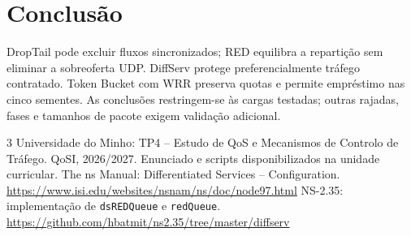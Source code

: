 \documentclass[runningheads]{llncs}
\begin{document}
\section{Conclusão}
DropTail pode excluir fluxos sincronizados; RED equilibra a repartição sem eliminar a sobreoferta UDP. DiffServ protege preferencialmente tráfego contratado. Token Bucket com WRR preserva quotas e permite empréstimo nas cinco sementes. As conclusões restringem-se às cargas testadas; outras rajadas, fases e tamanhos de pacote exigem validação adicional.

\begin{thebibliography}{3}
 Universidade do Minho: TP4 -- Estudo de QoS e Mecanismos de Controlo de Tráfego. QoSI, 2026/2027. Enunciado e scripts disponibilizados na unidade curricular.
 The ns Manual: Differentiated Services -- Configuration. \url{https://www.isi.edu/websites/nsnam/ns/doc/node97.html}
 NS-2.35: implementação de \texttt{dsREDQueue} e \texttt{redQueue}. \url{https://github.com/hbatmit/ns2.35/tree/master/diffserv}
\end{thebibliography}
\end{document}

